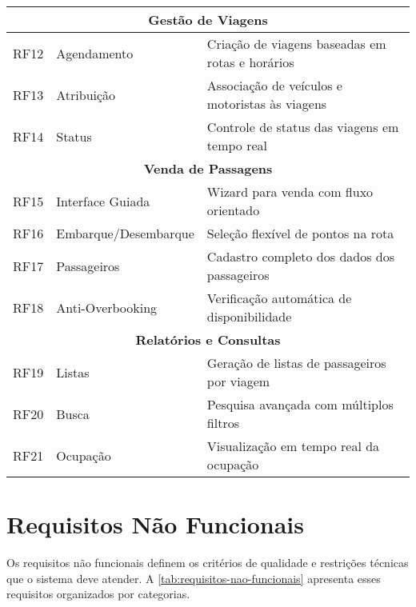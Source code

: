 \begin{table}[htbp]
{\begin{tabular}{|c|l|p{8cm}|}
      \hline
      \multicolumn{3}{|c|}{\textbf{Gestão de Viagens}}                                            \\
      \hline
      RF12        & Agendamento          & Criação de viagens baseadas em rotas e horários        \\
      RF13        & Atribuição           & Associação de veículos e motoristas às viagens         \\
      RF14        & Status               & Controle de status das viagens em tempo real           \\
      \hline
      \multicolumn{3}{|c|}{\textbf{Venda de Passagens}}                                           \\
      \hline
      RF15        & Interface Guiada     & Wizard para venda com fluxo orientado                  \\
      RF16        & Embarque/Desembarque & Seleção flexível de pontos na rota                     \\
      RF17        & Passageiros          & Cadastro completo dos dados dos passageiros            \\
      RF18        & Anti-Overbooking     & Verificação automática de disponibilidade              \\
      \hline
      \multicolumn{3}{|c|}{\textbf{Relatórios e Consultas}}                                       \\
      \hline
      RF19        & Listas               & Geração de listas de passageiros por viagem            \\
      RF20        & Busca                & Pesquisa avançada com múltiplos filtros                \\
      RF21        & Ocupação             & Visualização em tempo real da ocupação                 \\
      \hline
    \end{tabular}
  }
\end{table}

\section{Requisitos Não Funcionais}

Os requisitos não funcionais definem os critérios de qualidade e restrições técnicas que o sistema deve atender. A \autoref{tab:requisitos-nao-funcionais} apresenta esses requisitos organizados por categorias.

